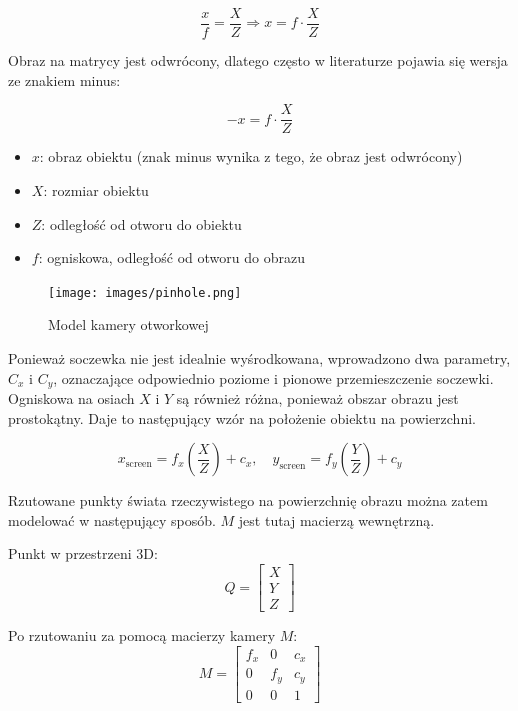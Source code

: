 \documentclass[magisterska]{pracadypl}
\begin{document}
\[
\frac{x}{f} = \frac{X}{Z} \Rightarrow x = f \cdot \frac{X}{Z}
\]

Obraz na matrycy jest odwrócony, dlatego często w literaturze pojawia się wersja ze znakiem minus:

\[
-x = f \cdot \frac{X}{Z}
\]

\begin{itemize}
  \item \textbf{$x$}: obraz obiektu (znak minus wynika z tego, że obraz jest odwrócony)
  \item \textbf{$X$}: rozmiar obiektu
  \item \textbf{$Z$}: odległość od otworu do obiektu
  \item \textbf{$f$}: ogniskowa, odległość od otworu do obrazu
\end{itemize}

\begin{figure}[H]  %
    \centering  %
    \texttt{[image: images/pinhole.png]}  %
    \captionsetup{font=footnotesize}
    \caption[Model kamery otworkowej. Learning OpenCV 3, O'Reilly, Str. 639]{Model kamery otworkowej}
    \label{fig:rpi}  %
\end{figure}

Ponieważ soczewka nie jest idealnie wyśrodkowana, wprowadzono dwa parametry, $C_x$ i $C_y$, oznaczające odpowiednio poziome i pionowe przemieszczenie soczewki.
Ogniskowa na osiach $X$ i $Y$ są również różna, ponieważ obszar obrazu jest prostokątny. Daje to następujący wzór na położenie obiektu na powierzchni.

\[
x_{\text{screen}} = f_x \left( \frac{X}{Z} \right) + c_x, \quad
y_{\text{screen}} = f_y \left( \frac{Y}{Z} \right) + c_y
\]

Rzutowane punkty świata rzeczywistego na powierzchnię obrazu można zatem modelować w następujący sposób. $M$ jest tutaj macierzą wewnętrzną.

\bigskip

Punkt w przestrzeni 3D:
\[
Q = \begin{bmatrix} X \\ Y \\ Z \end{bmatrix}
\]

Po rzutowaniu za pomocą macierzy kamery $M$:
\[
M = \begin{bmatrix}
f_x & 0 & c_x \\
0 & f_y & c_y \\
0 & 0 & 1
\end{bmatrix}
\]
\end{document}

